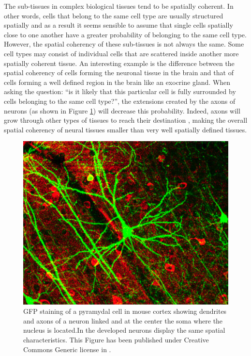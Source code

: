      
    The sub-tissues in complex biological tissues tend to be spatially coherent. In other words, cells that belong to the same cell type are usually structured spatially and as a result it seems sensible to assume that single cells spatially close to one another have a greater probability of belonging to the same cell type. However, the spatial coherency of these sub-tissues is not always the same. Some cell types may consist of individual cells that are scattered inside another more spatially coherent tissue. An interesting example is the difference between the spatial coherency of cells forming the neuronal tissue in the brain and that of cells forming a well defined region in the brain like an exocrine gland. When asking the question: ``is it likely that this particular cell is fully surrounded by cells belonging to the same cell type?'', the extensions created by the axons of neurons (as shown in Figure \ref{fig:neuron}) will decrease this probability. Indeed, axons will grow through other types of tissues to reach their destination \citep{bartlett84,colello90}, making the overall spatial coherency of neural tissues smaller than very well spatially defined tissues.\\
    
\begin{figure}[bth]
\begin{center}
  \includegraphics[width=0.8\linewidth]{gfx/chapter1/neuron.png}
\end{center}
  \caption{GFP staining of a pyramydal cell in mouse cortex showing dendrites and axons of a neuron linked and at the center the soma where the nucleus is located.In \platy{} the developed neurons display the same spatial characteristics. This Figure has been published under Creative Commons Generic license in \citep{lee06}.}
  \label{fig:neuron}
\end{figure}
	
